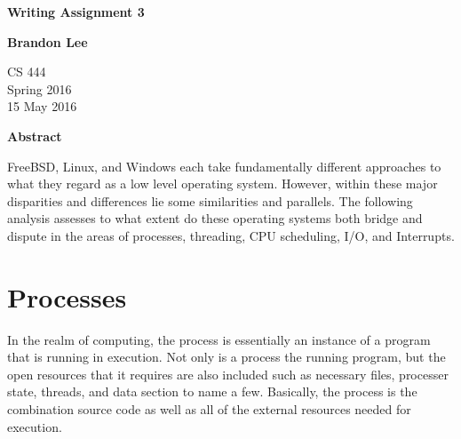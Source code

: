 \documentclass[letterpaper,10pt,titlepage]{article}
\begin{document}
\begin{titlepage}
    \begin{center}
        \vspace*{3.5cm}

        \textbf{Writing Assignment 3}

        \vspace{0.5cm}

        \textbf{Brandon Lee}

        \vspace{0.8cm}

        CS 444\\
        Spring 2016\\
        15 May 2016\\

        \vspace{1cm}

        \textbf{Abstract}\\

        \vspace{0.5cm}

        FreeBSD, Linux, and Windows each take fundamentally different approaches to what they regard as a low level operating system.  However, within these major disparities and differences lie some similarities and parallels.  The following analysis assesses to what extent do these operating systems both bridge and dispute in the areas of processes, threading, CPU scheduling, I/O, and Interrupts.

        \vfill

    \end{center}
\end{titlepage}

\newpage

\tableofcontents

\newpage

\section{Processes}

In the realm of computing, the process is essentially an instance of a program that is running in execution.  Not only is a process the running program, but the open resources that it requires are also included such as necessary files, processer state, threads, and data section to name a few.  Basically, the process is the combination source code as well as all of the external resources needed for execution.
\end{document}
